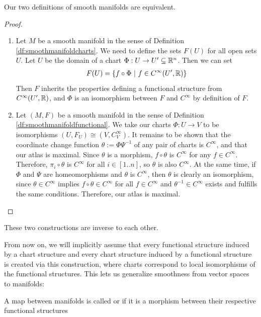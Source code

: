 \pagebreak
\begin{theorem}
	Our two definitions of smooth manifolds are equivalent.
\end{theorem}
\begin{proof}
	\begin{enumerate}
		\item[$\Rightarrow:$] Let $M$ be a smooth manifold in the sense of Definition \ref{df:smoothmanifoldcharts}. We need to define the sets $F(U)$ for all open sets $U$. Let $U$ be the domain of a chart $\Phi : U \to U' \subseteq \mathbb{R}^n$. Then we can set
		\begin{align*}
			F(U) = \qty{f \circ \Phi ~\middle|~f \in C^\infty(U', \mathbb{R})}
		\end{align*}
		Then $F$ inherits the properties defining a functional structure from $C^\infty(U', \mathbb{R})$, and $\Phi$ is an isomorphism between $F$ and $C^\infty$ by definition of $F$.
		\item[$\Leftarrow:$] Let $(M, F)$ be a smooth manifold in the sense of Definition \ref{df:smoothmanifoldfunctional}. We take our charts $\Phi : U \to V$ to be isomorphisms $(U, F_U) \cong (V, C_V^\infty)$. 
		\newpar
		It remains to be shown that the coordinate change function $\theta := \Phi\Psi^{-1}$ of any pair of charts is $C^\infty$, and that our atlas is maximal.
		Since $\theta$ is a morphism, $f \circ \theta$ is $C^\infty$ for any $f \in C^\infty$. Therefore, $\pi_i \circ \theta$ is $C^\infty$ for all $i \in [1..n]$, so $\theta$ is also $C^\infty$. 
		\newpar
		At the same time, if $\Phi$ and $\Psi$ are homeomorphisms and $\theta$ is $C^\infty$, then $\theta$ is clearly an isomorphism, since $\theta \in C^\infty$ implies $f \circ \theta \in C^\infty$ for all $f \in C^\infty$ and $\theta^{-1} \in C^\infty$ exists and fulfills the same conditions. Therefore, our atlas is maximal.
	\end{enumerate}
\end{proof}
\begin{proposition}
	These two constructions are inverse to each other.
\end{proposition}
From now on, we will implicitly assume that every functional structure induced by a chart structure and every chart structure induced by a functional structure is created via this construction, where charts correspond to local isomorphisms of the functional structures.
\newpar
This lets us generalize smoothness from vector spaces to manifolds:
\begin{importantdefinition}{}{}
	A map between manifolds is called  or  if it is a morphism between their respective functional structures
\end{importantdefinition}
